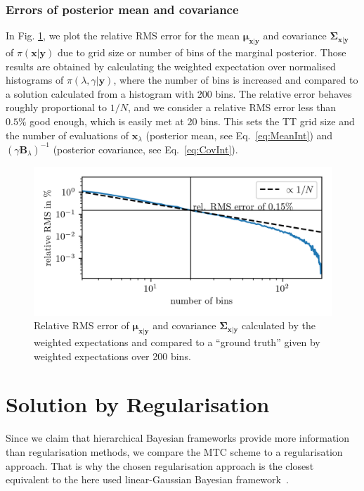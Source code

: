 \clearpage

\subsubsection{Errors of posterior mean and covariance}
\noindent In Fig. \ref{fig:MeanVarError}, we plot the relative RMS error for the mean $\bm{\mu}_{\bm{x}|\bm{y}}$ and covariance $\bm{\Sigma}_{\bm{x}|\bm{y}}$ of $\pi(\bm{x}|\bm{y})$ due to grid size or number of bins of the marginal posterior.
Those results are obtained by calculating the weighted expectation over normalised histograms of $\pi(\lambda,\gamma | \bm{y})$, where the number of bins is increased and compared to a solution calculated from a histogram with 200 bins.
The relative error behaves roughly proportional to $1/N$, and we consider a relative RMS error less than $0.5\%$ good enough, which is easily met at 20 bins.
This sets the TT grid size and the number of evaluations of $\bm{x}_{\lambda}$ (posterior mean, see Eq.~\ref{eq:MeanInt}) and $(\gamma \bm{B}_{\lambda})^{-1}$ (posterior covariance, see Eq.~\ref{eq:CovInt}).
\begin{figure}[ht!]
	\centering
	\includegraphics{relErrO3MeanVar.png}
	\caption[Relative Error of full posterior mean and covariance.]{Relative RMS error of $\bm{\mu}_{\bm{x}|\bm{y}}$ and covariance $\bm{\Sigma}_{\bm{x}|\bm{y}}$ calculated by the weighted expectations and compared to a ``ground truth'' given by weighted expectations over 200 bins.}
	\label{fig:MeanVarError}
\end{figure}
\clearpage



\section{Solution by Regularisation}
\label{sec:SolByReg}
Since we claim that hierarchical Bayesian frameworks provide more information than regularisation methods, we compare the MTC scheme to a regularisation approach.
That is why the chosen regularisation approach is the closest equivalent to the here used linear-Gaussian Bayesian framework~\cite{fox2016fast}.

